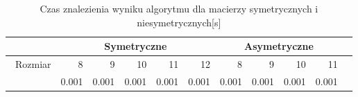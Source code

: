 \begin{table}
\centering
\begin{tabular}{|r|r|r|r|r|r|r|r|r|r|r|}
\hline
 & \multicolumn{5}{|c|}{Symetryczne} & \multicolumn{4}{|c|}{Asymetryczne} \\ \hline\
Rozmiar & 8 & 9 & 10 & 11 & 12 & 8 & 9 & 10 & 11 \\ \hline
& 0.001 & 0.001 & 0.001 & 0.001 & 0.001 & 0.001 & 0.001 & 0.001 & 0.001 \\\hline
\end{tabular}
\caption{Czas znalezienia wyniku algorytmu dla macierzy symetrycznych i niesymetrycznych[s]}
\label{tab:time_PrevAo}
\end{table}
